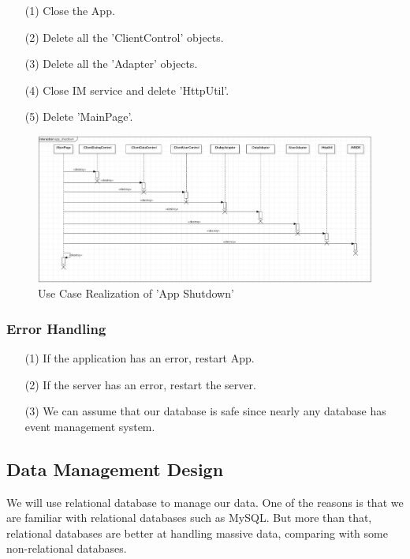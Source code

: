 \documentclass[10pt]{article}
\begin{document}
\begin{itemize}
	\item[(1)] Close the App.
	\item[(2)] Delete all the 'ClientControl' objects.
	\item[(3)] Delete all the 'Adapter' objects.
	\item[(4)] Close IM service and delete 'HttpUtil'.
	\item[(5)] Delete 'MainPage'.    
\end{itemize}

\begin{figure}[H]
	\centering
	\includegraphics[width=14cm]{4.jpg} 
	\caption{Use Case Realization of 'App Shutdown'}
	\label{Use Case Realization of 'App Shutdown'}
\end{figure}

\subsubsection{Error Handling}

\begin{itemize}
	\item[(1)] If the application has an error, restart App.
	\item[(2)] If the server has an error, restart the server.
	\item[(3)] We can assume that our database is safe since nearly any database has event management system. 
\end{itemize}

\subsection{Data Management Design}
We will use relational database to manage our data. One of the reasons is that we are familiar with relational databases such as MySQL. But more than that, relational databases are better at handling massive data, comparing with some non-relational databases.
\end{document}
